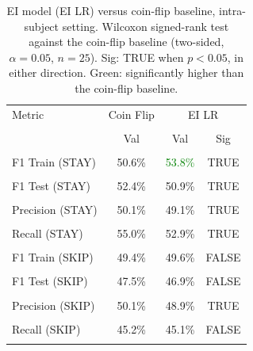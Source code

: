 \begin{table}[H]
\centering
\begin{tabular}{lccc}
\hline
Metric & Coin Flip & \multicolumn{2}{c}{EI LR} \\\\
 & Val & Val & Sig \\\\
\hline
F1 Train (STAY) & 50.6\% & \textcolor{green}{53.8\%} & TRUE \\\\
F1 Test (STAY) & 52.4\% & 50.9\% & TRUE \\\\
Precision (STAY) & 50.1\% & 49.1\% & TRUE \\\\
Recall (STAY) & 55.0\% & 52.9\% & TRUE \\\\
F1 Train (SKIP) & 49.4\% & 49.6\% & FALSE \\\\
F1 Test (SKIP) & 47.5\% & 46.9\% & FALSE \\\\
Precision (SKIP) & 50.1\% & 48.9\% & TRUE \\\\
Recall (SKIP) & 45.2\% & 45.1\% & FALSE \\\\
\hline
\end{tabular}
\caption{EI model (EI LR) versus coin-flip baseline, intra-subject setting. Wilcoxon signed-rank test against the coin-flip baseline (two-sided, $\alpha=0.05$, $n=25$). Sig: TRUE when $p<0.05$, in either direction. Green: significantly higher than the coin-flip baseline.}
\label{tab:metrics_1_intra}
\end{table}